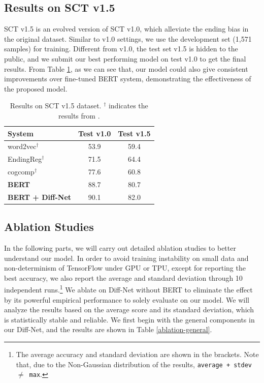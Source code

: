 \documentclass[letterpaper]{article} %
\begin{document}
\subsection{Results on SCT v1.5}
SCT v1.5 \cite{sharma-etal-2018-tackling} is an evolved version of SCT v1.0, which alleviate the ending bias in the original dataset.
Similar to v1.0 settings, we use the development set (1,571 samples) for training.
Different from v1.0, the test set v1.5 is hidden to the public, and we submit our best performing model on test v1.0 to get the final results.
From Table \ref{sct15-results}, as we can see that, our model could also give consistent improvements over fine-tuned BERT system, demonstrating the effectiveness of the proposed model.

\begin{table}[t]
\small
\begin{center}
\begin{tabular}{p{3.5cm} cc}
\toprule
{\bf System} 					& {\bf Test v1.0} & {\bf Test v1.5} \\
\midrule
word2vec$^\dag$					& 53.9 & 59.4 \\
EndingReg$^\dag$					& 71.5 & 64.4 \\
cogcomp$^\dag$					& 77.6 & 60.8 \\
\midrule
\bf BERT 						& 88.7 & 80.7 \\
\bf BERT + Diff-Net 			& 90.1 & 82.0 \\
\bottomrule
\end{tabular}
\end{center}
\caption{\label{sct15-results} Results on SCT v1.5 dataset. $^\dag$ indicates the results from \citeauthor{sharma-etal-2018-tackling} .   }
\end{table}



\subsection{Ablation Studies}
In the following parts, we will carry out detailed ablation studies to better understand our model.
In order to avoid training instability on small data and non-determinism of TensorFlow under GPU or TPU, except for reporting the best accuracy, we also report the average and standard deviation through 10 independent runs.\footnote{The average accuracy and standard deviation are shown in the brackets. Note that, due to the Non-Gaussian distribution of the results, {\tt average + stdev $\ne$ max}.}
We ablate on Diff-Net without BERT to eliminate the effect by its powerful empirical performance to solely evaluate on our model.
We will analyze the results based on the average score and its standard deviation, which is statistically stable and reliable.
We first begin with the general components in our Diff-Net, and the results are shown in Table \ref{ablation-general}.
\end{document}
